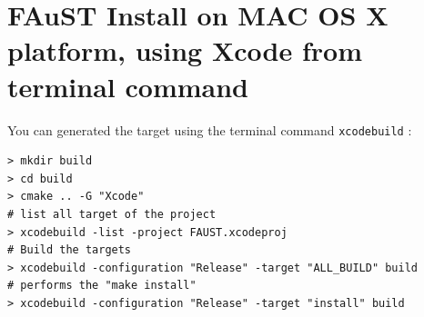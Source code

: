 \section{FAuST Install on MAC OS X platform, using Xcode from terminal command}\label{sec:ANNEXEInstallMACXcodeTerminal}
You can generated the target using the terminal command \texttt{xcodebuild} :
\lstset{style=customBash}
\begin{lstlisting}
> mkdir build
> cd build
> cmake .. -G "Xcode"	
# list all target of the project
> xcodebuild -list -project FAUST.xcodeproj 	
# Build the targets
> xcodebuild -configuration "Release" -target "ALL_BUILD" build 	
# performs the "make install"
> xcodebuild -configuration "Release" -target "install" build 
\end{lstlisting}





